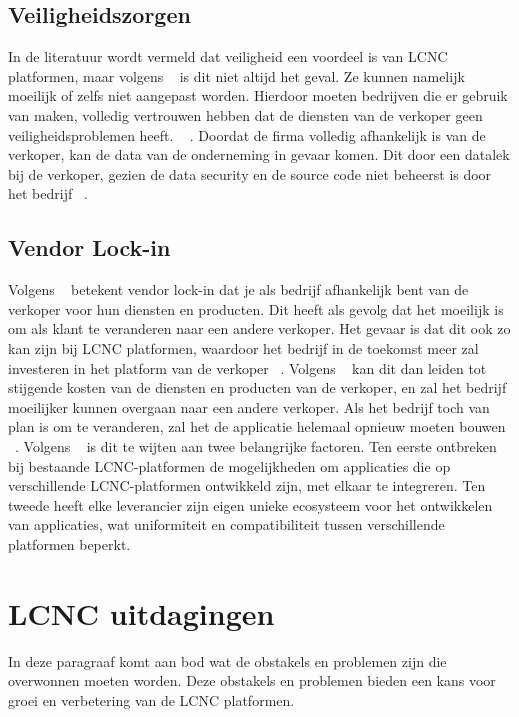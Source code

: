 \subsection*{Veiligheidszorgen}
\label{subsec:veiligheidszorgen}
In de literatuur wordt vermeld dat veiligheid een voordeel is van LCNC platformen, maar volgens ~\textcite{Yan2021} is dit niet altijd het geval. 
Ze kunnen namelijk moeilijk of zelfs niet aangepast worden. Hierdoor moeten bedrijven die er gebruik van maken, volledig vertrouwen hebben dat de diensten van de verkoper geen veiligheidsproblemen heeft. ~\autocite{Yan2021} \autocite{Rokis_2022}. 
Doordat de firma volledig afhankelijk is van de verkoper, kan de data van de onderneming in gevaar komen. Dit door een datalek bij de verkoper, gezien 
de data security en de source code niet beheerst is door het bedrijf ~\autocite{Yan2021}.

\subsection*{Vendor Lock-in}
\label{subsec:technische-schulden}
Volgens ~\textcite{Yan2021} betekent vendor lock-in dat je als bedrijf afhankelijk bent van de verkoper voor hun diensten en producten. 
Dit heeft als gevolg dat het moeilijk is om als klant te veranderen naar een andere verkoper. Het gevaar is dat dit ook zo kan zijn bij LCNC platformen, 
waardoor het bedrijf in de toekomst meer zal investeren in het platform van de verkoper ~\autocite{Yan2021}. 
Volgens ~\textcite{Yan2021} kan dit dan leiden tot stijgende kosten van de diensten en producten van de verkoper, 
en zal het bedrijf moeilijker kunnen overgaan naar een andere verkoper. Als het bedrijf toch van plan is om te veranderen, 
zal het de applicatie helemaal opnieuw moeten bouwen ~\autocite{Sufi_2023}.  
Volgens ~\textcite{Sufi_2023} is dit te wijten aan twee belangrijke factoren. 
Ten eerste ontbreken bij bestaande LCNC-platformen de mogelijkheden om applicaties die op verschillende LCNC-platformen ontwikkeld zijn, met elkaar te integreren.
Ten tweede heeft elke leverancier zijn eigen unieke ecosysteem voor het ontwikkelen van applicaties, wat uniformiteit en compatibiliteit tussen verschillende platformen beperkt.


\section{LCNC uitdagingen}
\label{sec:lcnc-uitdagingen}
In deze paragraaf komt aan bod wat de obstakels en problemen zijn die overwonnen moeten worden. Deze obstakels en problemen bieden een kans voor groei en
verbetering van de LCNC platformen.
